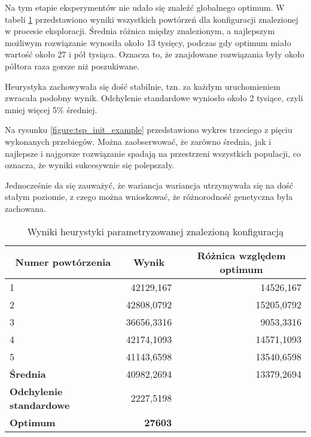 \documentclass[./FM_mgr.tex]{subfiles}
\begin{document}
Na tym etapie eksperymentów nie udało się znaleźć globalnego optimum.
W tabeli \ref{table:tsp_init_results} przedstawiono wyniki wszystkich powtórzeń dla konfiguracji znalezionej w procesie eksploracji.
Średnia różnica między znalezionym, a najlepszym możliwym rozwiązanie wynosiła około 13 tysięcy, podczas gdy optimum miało wartość około 27 i pół tysiąca.
Oznacza to, że znajdowane rozwiązania były około półtora raza gorsze niż poszukiwane.

Heurystyka zachowywała się dość stabilnie, tzn. za każdym uruchomieniem zwracała podobny wynik.
Odchylenie standardowe wyniosło około 2 tysiące, czyli mniej więcej 5\% średniej.

Na rysunku \ref{figure:tsp_init_example} przedstawiono wykres trzeciego z pięciu wykonanych przebiegów.
Można zaobserwować, że zarówno średnia, jak i najlepsze i najgorsze rozwiązanie spadają na przestrzeni wszystkich populacji, co oznacza, że wyniki sukcesywnie się polepszały.

Jednocześnie da się zauważyć, że wariancja wariancja utrzymywała się na dość stałym poziomie, z czego można wnioskować, że różnorodność genetyczna była zachowana.

\begin{table}[H]
	\caption{Wyniki heurystyki parametryzowanej znalezioną konfiguracją \label{table:tsp_init_results}}
	\centering
	\begin{tabular}{|l|r|r}
		\hline
		\multicolumn{1}{|c|}{{\bf Numer powtórzenia}} & \multicolumn{1}{c|}{{\bf Wynik}} & \multicolumn{1}{c|}{{\bf Różnica względem optimum}} \\ \hline \hline
		1                                             & 42129,167                        & \multicolumn{1}{r|}{14526,167}                      \\ \hline
		2                                             & 42808,0792                       & \multicolumn{1}{r|}{15205,0792}                     \\ \hline
		3                                             & 36656,3316                       & \multicolumn{1}{r|}{9053,3316}                      \\ \hline
		4                                             & 42174,1093                       & \multicolumn{1}{r|}{14571,1093}                     \\ \hline
		5                                             & 41143,6598                       & \multicolumn{1}{r|}{13540,6598}                     \\ \hline \hline
		{\bf Średnia}                                 & 40982,2694                      & \multicolumn{1}{r|}{13379,2694}                    \\ \hline
		{\bf Odchylenie standardowe}                  & 2227,5198                        &                       \\  \hhline{==~}
		{\bf Optimum}                                 & \multicolumn{1}{r|}{{\bf 27603}} & \multicolumn{1}{l}{}                                \\ \cline{1-2}
	\end{tabular}
\end{table}
\end{document}
